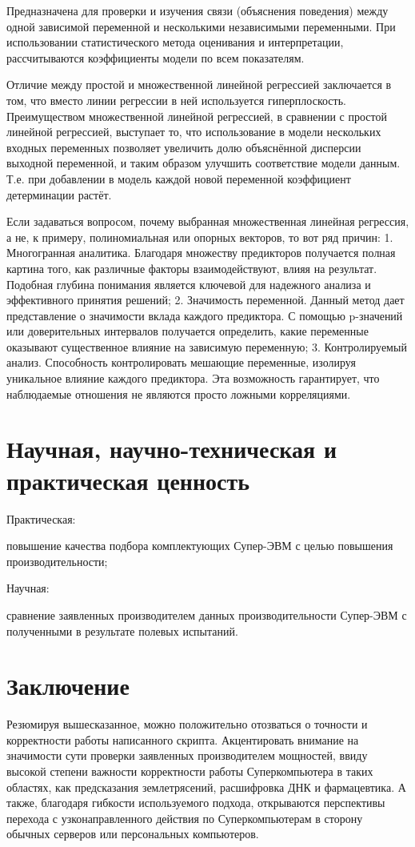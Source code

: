 \documentclass{article}
\begin{document}
Предназначена для проверки и изучения связи (объяснения поведения) между одной зависимой переменной и несколькими независимыми переменными. При использовании статистического метода оценивания и интерпретации, рассчитываются коэффициенты модели по всем показателям.

Отличие между простой и множественной линейной регрессией заключается в том, что вместо линии регрессии в ней используется гиперплоскость.
Преимуществом множественной линейной регрессией, в сравнении с простой линейной регрессией, выступает то, что использование в модели нескольких входных переменных позволяет увеличить долю объяснённой дисперсии выходной переменной, и таким образом улучшить соответствие модели данным. Т.е. при добавлении в модель каждой новой переменной коэффициент детерминации растёт.

Если задаваться вопросом, почему выбранная множественная линейная регрессия, а не, к примеру, полиномиальная или опорных векторов, то вот ряд причин:
1. Многогранная аналитика. Благодаря множеству предикторов получается полная картина того, как различные факторы взаимодействуют, влияя на результат. Подобная глубина понимания является ключевой для надежного анализа и эффективного принятия решений;
2. Значимость переменной. Данный метод дает представление о значимости вклада каждого предиктора. С помощью p-значений или доверительных интервалов получается определить, какие переменные оказывают существенное влияние на зависимую переменную;
3. Контролируемый анализ. Способность контролировать мешающие переменные, изолируя уникальное влияние каждого предиктора. Эта возможность гарантирует, что наблюдаемые отношения не являются просто ложными корреляциями.

\section{Научная, научно-техническая и практическая ценность}
Практическая:

повышение качества подбора комплектующих Супер-ЭВМ с целью повышения производительности;

Научная:

сравнение заявленных производителем данных производительности Супер-ЭВМ с полученными в результате полевых испытаний.

\section{Заключение}
Резюмируя вышесказанное, можно положительно отозваться о точности и корректности работы написанного скрипта. Акцентировать внимание на значимости сути проверки заявленных производителем мощностей, ввиду высокой степени важности корректности работы Суперкомпьютера в таких областях, как предсказания землетрясений, расшифровка ДНК и фармацевтика. А также, благодаря гибкости используемого подхода, открываются перспективы перехода с узконаправленного действия по Суперкомпьютерам в сторону обычных серверов или персональных компьютеров.
\end{document}
